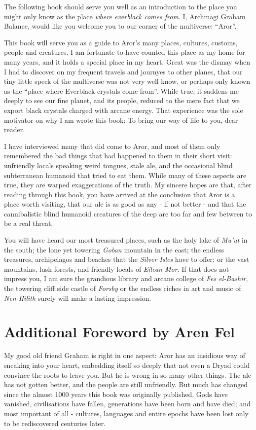 The following book should serve you well as an introduction to the
place you might only know as the place \emph{where everblack comes
  from}. I, Archmagi Graham Balance, would like you welcome you to
our corner of the multiverse: ``Aror''.

This book will serve you as a guide to Aror's many places, cultures,
customs, people and creatures. I am fortunate to have counted this
place as my home for many years, and it holds a special place in my
heart. Great was the dismay when I had to discover on my frequent
travels and journyes to other planes, that our tiny little speck of
the multiverse was not very well know, or perhaps only known as the
``place where Everblack crystals come from''. While true, it saddens
me deeply to see our fine planet, and its people, reduced to the mere
fact that we export black crystals charged with arcane energy. That
experience was the sole motivator on why I am wrote this book: To bring
our way of life to you, dear reader.

I have interviewed many that did come to Aror, and most of them only
remembered the bad things that had happened to them in their short
visit: unfriendly locals speaking weird tongues, stale ale, and the
occasional blind subterranean humanoid that tried to eat them. While
many of these aspects are true, they are warped exaggerations of the
truth. My sincere hopes are that, after reading through this book, you
have arrived at the conclusion that Aror is a place worth visiting,
that our ale is as good as any - if not better - and that the
cannibalistic blind humanoid creatures of the deep are too far and few
between to be a real threat.

You will have heard our most treasured places, such as the holy lake of
\emph{Mu'ut} in the south; the lone yet towering \emph{Goban} mountain in the
east; the endless treasures, archipelagos and beaches that the \emph{Silver
  Isles} have to offer; or the vast mountains, lush forests, and friendly
locals of \emph{Eilean Mor}. If that does not impress you, I am sure the
grandious library and arcane college of \emph{Fes el-Bashir}, the towering
cliff side castle of \emph{Forsby} or the endless riches in art and music of
\emph{Nen-Hilith} surely will make a lasting impression.

\section{Additional Foreword by Aren Fel}

My good old friend Graham is right in one aspect: Aror has an insidious
way of sneaking into your heart, embedding itself so deeply that not
even a Dryad could convince the roots to leave you. But he is wrong in
so many other things. The ale has not gotten better, and the people
are still unfriendly. But much has changed since the almost 1000 years
this book was originally published. Gods have vanished, civilisations
have fallen, generations have been born and have died; and most important
of all - cultures, languages and entire epochs have been lost only to be
rediscovered centuries later.

